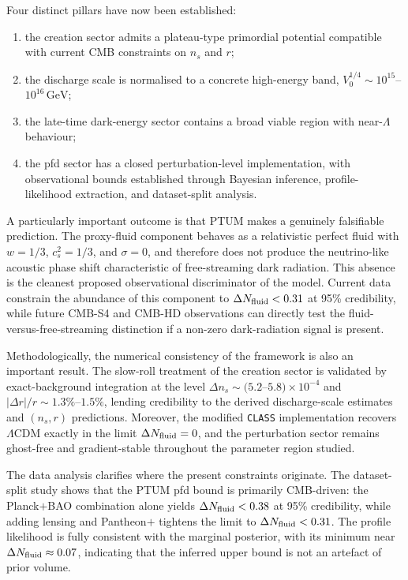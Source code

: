 \documentclass[epj]{svjour}
\begin{document}
Four distinct pillars have now been established:
\begin{enumerate}[label=(\roman*)]
\item the creation sector admits a plateau-type primordial potential
      compatible with current CMB constraints on $n_s$ and $r$;
\item the discharge scale is normalised to a concrete high-energy
      band, $V_0^{1/4}\sim10^{15}$--$10^{16}\,\mathrm{GeV}$;
\item the late-time dark-energy sector contains a broad viable
      region with near-$\Lambda$ behaviour;
\item the pfd sector has a closed perturbation-level
      implementation, with observational bounds established through
      Bayesian inference, profile-likelihood extraction, and
      dataset-split analysis.
\end{enumerate}

A particularly important outcome is that PTUM makes a genuinely
falsifiable prediction. The proxy-fluid component behaves as a
relativistic perfect fluid with
$w=1/3$, $c_s^2=1/3$, and $\sigma=0$, and therefore does not
produce the neutrino-like acoustic phase shift characteristic of
free-streaming dark radiation. This absence is the cleanest proposed observational discriminator
of the model. Current data constrain the abundance of this
component to $\Delta N_{\rm fluid}<0.31$ at 95\% credibility,
while future CMB-S4 and CMB-HD observations can directly test the
fluid-versus-free-streaming distinction if a non-zero dark-radiation
signal is present.

Methodologically, the numerical consistency of the framework is also
an important result. The slow-roll treatment of the creation sector
is validated by exact-background integration at the level
$\Delta n_s\sim(5.2$--$5.8)\times10^{-4}$ and
$|\Delta r|/r\sim1.3\%$--$1.5\%$, lending credibility to the
derived discharge-scale estimates and $(n_s,r)$ predictions.
Moreover, the modified \texttt{CLASS} implementation recovers
$\Lambda$CDM exactly in the limit $\Delta N_{\rm fluid}=0$, and
the perturbation sector remains ghost-free and gradient-stable
throughout the parameter region studied.

The data analysis clarifies where the present constraints originate.
The dataset-split study shows that the PTUM pfd bound is primarily
CMB-driven: the Planck$+$BAO combination alone yields
$\Delta N_{\rm fluid}<0.38$ at 95\% credibility, while adding
lensing and Pantheon$+$ tightens the limit to
$\Delta N_{\rm fluid}<0.31$. The profile likelihood is fully
consistent with the marginal posterior, with its minimum near
$\Delta N_{\rm fluid}\approx0.07$, indicating that the inferred
upper bound is not an artefact of prior volume.
\end{document}
